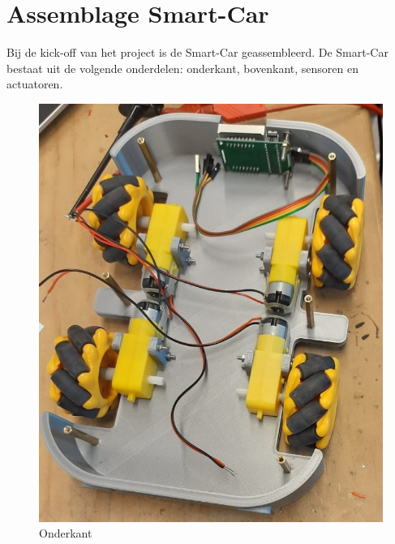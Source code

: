\section{Assemblage Smart-Car}
Bij de kick-off van het project is de \gls{Smart-Car} geassembleerd.
De \gls{Smart-Car} bestaat uit de volgende onderdelen: onderkant, bovenkant, sensoren en actuatoren.




\begin{figure}[h]
    \centering
    \includegraphics[scale = 0.35]{Media/Figuren/Assemblage/assembleren onderkant.jpg}
    \caption{Onderkant}
    \label{Onderkant-Smart-Car}
\end{figure}

